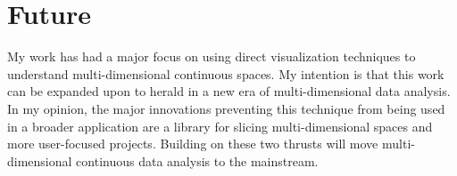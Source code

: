 
\section{Future}

 My work has had a major focus on using
direct visualization techniques to understand multi-dimensional continuous
spaces. My intention is that this work can be expanded upon to herald in a new
era of multi-dimensional data analysis.   In my opinion, the
major innovations preventing this technique from being used in a broader
application are a library for slicing multi-dimensional spaces and more
user-focused projects. Building on these two thrusts will move
multi-dimensional continuous data analysis to the mainstream.




